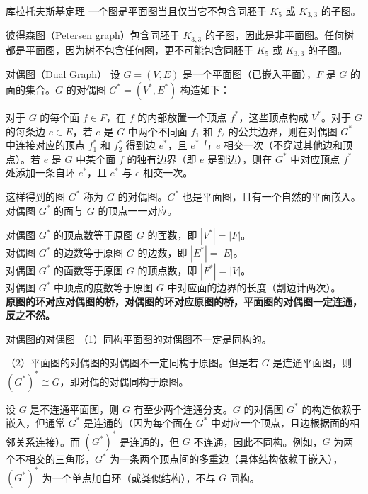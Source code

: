 \begin{theorem}{库拉托夫斯基定理}{}
    一个图是平面图当且仅当它不包含同胚于 $K_5$ 或 $K_{3,3}$ 的子图。
\end{theorem}
彼得森图（Petersen graph）包含同胚于 $K_{3,3}$ 的子图，因此是非平面图。任何树都是平面图，因为树不包含任何圈，更不可能包含同胚于 $K_5$ 或 $K_{3,3}$ 的子图。
\begin{definition}{对偶图（Dual Graph）}{}
设 $G=(V,E)$ 是一个平面图（已嵌入平面），$F$ 是 $G$ 的面的集合。$G$ 的对偶图 $G^*=(V^*,E^*)$ 构造如下：

对于 $G$ 的每个面 $f \in F$，在 $f$ 的内部放置一个顶点 $f^*$，这些顶点构成 $V^*$。对于 $G$ 的每条边 $e \in E$，若 $e$ 是 $G$ 中两个不同面 $f_1$ 和 $f_2$ 的公共边界，则在对偶图 $G^*$ 中连接对应的顶点 $f_1^*$ 和 $f_2^*$ 得到边 $e^*$，且 $e^*$ 与 $e$ 相交一次（不穿过其他边和顶点）。若 $e$ 是 $G$ 中某个面 $f$ 的独有边界（即 $e$ 是割边），则在 $G^*$ 中对应顶点 $f^*$ 处添加一条自环 $e^*$，且 $e^*$ 与 $e$ 相交一次。

这样得到的图 $G^*$ 称为 $G$ 的对偶图。$G^*$ 也是平面图，且有一个自然的平面嵌入。对偶图 $G^*$ 的面与 $G$ 的顶点一一对应。
\end{definition}
对偶图 $G^*$ 的顶点数等于原图 $G$ 的面数，即 $|V^*| = |F|$。\\
对偶图 $G^*$ 的边数等于原图 $G$ 的边数，即 $|E^*| = |E|$。\\
对偶图 $G^*$ 的面数等于原图 $G$ 的顶点数，即 $|F^*| = |V|$。\\
对偶图 $G^*$ 中顶点的度数等于原图 $G$ 中对应面的边界的长度（割边计两次）。\\
\textbf{原图的环对应对偶图的桥，对偶图的环对应原图的桥，平面图的对偶图一定连通，反之不然。}
\begin{theorem}{对偶图的对偶图}{}
（1）同构平面图的对偶图不一定是同构的。

（2）平面图的对偶图的对偶图不一定同构于原图。但是若 $G$ 是连通平面图，则 $(G^*)^* \cong G$，即对偶的对偶同构于原图。
\end{theorem}
设 $G$ 是不连通平面图，则 $G$ 有至少两个连通分支。$G$ 的对偶图 $G^*$ 的构造依赖于嵌入，但通常 $G^*$ 是连通的（因为每个面在 $G^*$ 中对应一个顶点，且边根据面的相邻关系连接）。而 $(G^*)^*$ 是连通的，但 $G$ 不连通，因此不同构。例如，$G$ 为两个不相交的三角形，$G^*$ 为一条两个顶点间的多重边（具体结构依赖于嵌入），$(G^*)^*$ 为一个单点加自环（或类似结构），不与 $G$ 同构。

